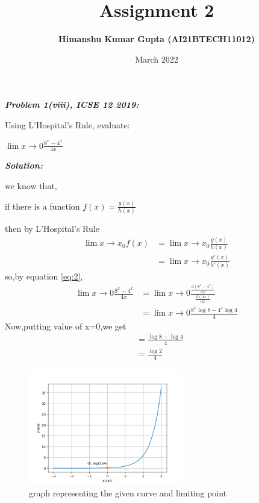 \documentclass[journal,12pt,twocolumn]{IEEEtran}
\begin{document}
\newcommand{\myvec}[1]{\ensuremath{\begin{pmatrix}#1\end{pmatrix}}}

\let\vec\mathbf


\title{Assignment 2}
\author{\textbf{Himanshu Kumar Gupta (AI21BTECH11012)}}
\maketitle
\date {March 2022}


\textbf{\textit{Problem 1(viii), ICSE 12 2019:}}

Using L’Hospital’s Rule, evaluate:

 $\lim{x\to0} \frac{8^x-4^x}{4x}$

\textbf{\textit{Solution:}}

we know that,

if there is a function $f(x)=\frac{g(x)}{h(x)}$

then by L’Hospital’s Rule 
\begin{align}
\lim{x\to x_0} f(x)&=\lim{x\to x_0} \frac{g(x)}{h(x)}  \\
\label{eq:2}
&=\lim{x\to x_0} \frac{g'(x)}{h'(x)}
\end{align}
so,by equation \eqref{eq:2},
\begin{align}
\lim{x\to0} \frac{8^x-4^x}{4x}&=\lim{x\to0}
 \frac{\frac{\mathrm{d}(8^x-4^x)}{\mathrm{d}x}}{\frac{\mathrm{d}(4x)}{\mathrm{d}x}} \\
&=\lim{x\to0}\frac{8^x\log{8}-4^x\log{4}}{4}
\end{align}
Now,putting value of x=0,we get
\begin{align}
&=\frac{\log{8}-\log{4}}{4}       \\
&=\frac{\log{2}}{4}
\end{align}

\begin{figure}[htb!]
\includegraphics[width=0.60\textwidth]{figures/Figure_2.png}
\caption{graph representing the given curve and limiting point}
\end{figure}
\end{document}
